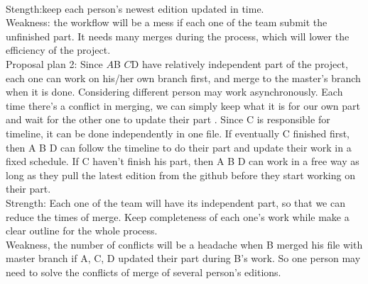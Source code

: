 \documentclass[12pt]{article}
\begin{document}
\\

Stength:keep each person's newest edition updated in time.
\\ Weakness: the workflow will be a mess if each one of the team submit the unfinished part. It needs many merges during the process, which will lower the efficiency of the project.
\\Proposal plan 2: Since $A $B $C $D have relatively independent part of the project, each one can work on his/her own branch first, and merge to the master's branch when it is done. Considering different person may work asynchronously. Each time there's a conflict in merging, we can simply keep what it is for our own part and wait for the other one to update their part . Since C is responsible for timeline, it can be done independently in one file. If eventually C finished first, then A B D can follow the timeline to do their part and update their work in a fixed schedule. If C haven't finish his part, then A B D can work in a free way as long as they pull the latest edition from the github before they start working on their part. 
\\Strength: Each one of the team will have its independent part, so that we can reduce the times of merge. Keep completeness of each one's work while make a clear outline for the whole process. 
\\Weakness, the number of conflicts will be a headache when B merged his file with master branch if  A, C, D  updated their part during B's work. So one person may need to solve the conflicts of merge of several person's editions. 

\end{document}
